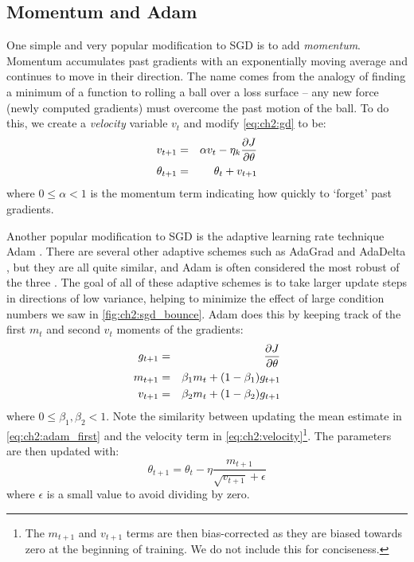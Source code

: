 \subsection{Momentum and Adam}
One simple and very popular modification to SGD is to add \emph{momentum}.
Momentum accumulates past gradients with an exponentially moving average and
continues to move in their direction. The name comes from the analogy of finding
a minimum of a function to rolling a ball over a loss surface --
any new force (newly computed gradients) must overcome the past motion of the
ball. To do this, we create a \emph{velocity} variable $v_{t}$ and modify
\eqref{eq:ch2:gd} to be:
\begin{eqnarray}
  v_{t+1} &=& \alpha v_t - \eta_k\frac{\partial J}{\partial \theta} \label{eq:ch2:velocity}\\
  \theta_{t+1} &=& \theta_t + v_{t+1} \\
\end{eqnarray}
where $0\leq\alpha<1$ is the momentum term indicating how quickly to `forget'
past gradients.

Another popular modification to SGD is the adaptive learning rate technique Adam
\cite{kingma_adam:_2014}. There are several other adaptive schemes such as
AdaGrad \cite{duchi_adaptive_2011} and AdaDelta \cite{zeiler_adadelta:_2012}, but
they are all quite similar, and Adam is often considered the most robust of the
three \cite{goodfellow_deep_2016}. The goal of all of these adaptive schemes is
to take larger update steps in directions of low variance, helping to minimize
the effect of large condition numbers we saw in \autoref{fig:ch2:sgd_bounce}.
Adam does this by keeping track of the first $m_t$ and second $v_t$ moments of the
gradients:
\begin{eqnarray}
  g_{t+1} &=& \frac{\partial J}{\partial \theta} \\
  m_{t+1} &=& \beta_1 m_{t} + (1-\beta_1)g_{t+1} \label{eq:ch2:adam_first}\\
  v_{t+1} &=& \beta_2 m_{t} + (1-\beta_2)g_{t+1} 
\end{eqnarray}
where $0 \leq \beta_1, \beta_2 < 1$. Note the similarity between updating the
mean estimate in \eqref{eq:ch2:adam_first} and the velocity term in
\eqref{eq:ch2:velocity}\footnote{The $m_{t+1}$ and $v_{t+1}$ terms are then
bias-corrected as they are biased towards zero at the beginning of training. We
do not include this for conciseness.}. The parameters are then updated with:
\begin{equation}
  \theta_{t+1} = \theta_t - \eta \frac{m_{t+1}}{\sqrt{v_{t+1}} + \epsilon}
\end{equation}
where $\epsilon$ is a small value to avoid dividing by zero. 
